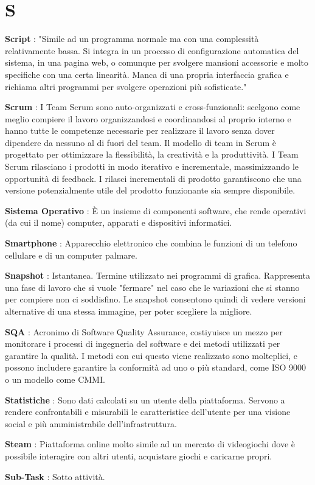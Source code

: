 \documentclass[12pt,a4paper,titlepage]{article}
\begin{document}
\section{S}
\begin{trivlist}
\item \textbf{Script} : "Simile ad un programma normale ma con una complessità relativamente bassa. Si integra in un processo di configurazione automatica del sistema, in una pagina web, o comunque per svolgere mansioni accessorie e molto specifiche con
una certa linearità. Manca di una propria interfaccia grafica e richiama altri programmi per svolgere operazioni più sofisticate."
\item \textbf{Scrum} : I Team Scrum sono auto-organizzati e cross-funzionali: scelgono come meglio compiere il lavoro organizzandosi e coordinandosi al proprio interno e hanno tutte le competenze necessarie per realizzare il lavoro senza dover dipendere da nessuno al di fuori del team. Il modello di team in Scrum è progettato per ottimizzare la flessibilità, la creatività e la produttività. I Team Scrum rilasciano i prodotti in modo iterativo e incrementale, massimizzando le opportunità di feedback. I rilasci incrementali di prodotto garantiscono che una versione potenzialmente utile del prodotto funzionante sia sempre disponibile.
\item \textbf{Sistema Operativo} : È un insieme di componenti software, che rende operativi (da cui il nome) computer, apparati e dispositivi informatici.
\item \textbf{Smartphone} : Apparecchio elettronico che combina le funzioni di un telefono cellulare e di un computer palmare.
\item \textbf{Snapshot} : Istantanea. Termine utilizzato nei programmi di grafica. Rappresenta una fase di lavoro che si vuole "fermare" nel caso che le variazioni che si stanno per compiere non ci soddisfino. Le snapshot consentono quindi di vedere versioni alternative di una stessa immagine, per poter scegliere la migliore.
\item \textbf{SQA} : Acronimo di Software Quality Assurance, costiyuisce un mezzo per monitorare i processi di ingegneria del software e dei metodi utilizzati per garantire la qualità. I metodi con cui questo viene realizzato sono molteplici, e possono includere garantire la conformità ad uno o più standard, come ISO 9000 o un modello come CMMI.
\item \textbf{Statistiche} : Sono dati calcolati su un utente della piattaforma. Servono a rendere confrontabili e misurabili le caratteristice dell'utente per una visione social e più amministrabile dell'infrastruttura.
\item \textbf{Steam} : Piattaforma online molto simile ad un mercato di videogiochi dove è possibile interagire con altri utenti, acquistare giochi e caricarne propri.
\item \textbf{Sub-Task} : Sotto attività.
\end{trivlist}
\end{document}
